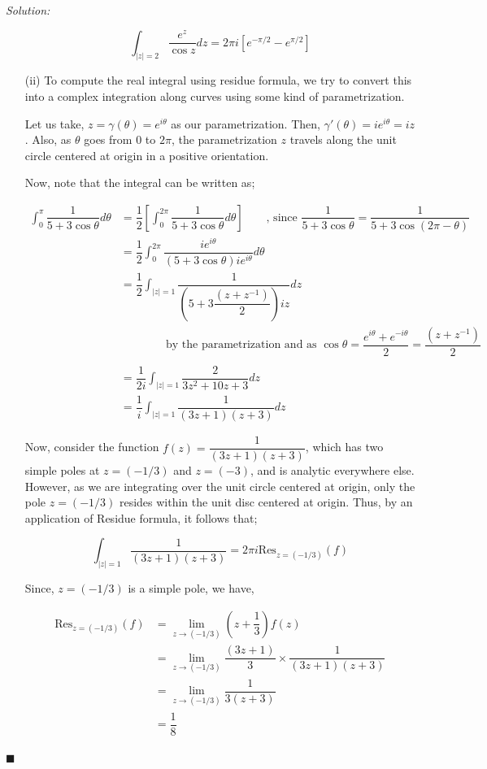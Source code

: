 \documentclass[12pt]{article}
\newcommand{\res}{\text{Res}}
\theoremstyle{definition}
\newenvironment{answer}{\textit{Solution: }\quad }{ \hfill $\blacksquare$}
\numberwithin{equation}{section}
\begin{document}
\begin{answer}
\begin{enumerate}
		$$
		\int_{\vert z \vert = 2} \dfrac{e^z}{\cos z} dz = 2\pi i \left[ e^{-\pi/2} - e^{\pi/ 2} \right]
		$$
		

		\item[(ii)] To compute the real integral using residue formula, we try to convert this into a complex integration along curves using some kind of parametrization. 
		
		Let us take, $z = \gamma(\theta) = e^{i\theta}$ as our parametrization. Then, $\gamma'(\theta) = i e^{i\theta} = iz$. Also, as $\theta$ goes from $0$ to $2\pi$, the parametrization $z$ travels along the unit circle centered at origin in a positive orientation.

		Now, note that the integral can be written as;

		\begin{align*}
			\int_{0}^{\pi} \dfrac{1}{5 + 3\cos \theta} d\theta
			& = \dfrac{1}{2} \left[ \int_{0}^{2\pi} \dfrac{1}{5 + 3 \cos \theta} d\theta\right] \qquad \text{, since } \dfrac{1}{5 + 3 \cos \theta} = \dfrac{1}{5 + 3 \cos (2\pi - \theta)}\\
			& = \dfrac{1}{2} \int_{0}^{2\pi} \dfrac{ie^{i\theta}}{(5 + 3 \cos \theta)ie^{i\theta}}d\theta\\
			& = \dfrac{1}{2} \int_{ \vert z \vert = 1} \dfrac{1}{\left(5 + 3 \dfrac{(z + z^{-1})}{2}\right) iz} dz\\
			& \qquad \qquad \text{by the parametrization and as } \cos \theta = \dfrac{e^{i\theta} + e^{-i\theta}}{2} = \dfrac{(z + z^{-1})}{2}\\
			& \\
			& = \dfrac{1}{2i} \int_{\vert z \vert = 1} \dfrac{2}{3z^2 + 10z + 3} dz\\
			& = \dfrac{1}{i} \int_{\vert z \vert = 1} \dfrac{1}{(3z + 1)(z + 3)}dz
		\end{align*}

		Now, consider the function $f(z) = \dfrac{1}{(3z + 1)(z+3)}$, which has two simple poles at $z = (-1/3)$ and $z = (-3)$, and is analytic everywhere else. However, as we are integrating over the unit circle centered at origin, only the pole $z = (-1/3)$ resides within the unit disc centered at origin. Thus, by an application of Residue formula, it follows that;

		$$
		\int_{\vert z \vert = 1} \dfrac{1}{(3z + 1)(z + 3)} = 2\pi i\res_{z = (-1/3)}(f)
		$$

		Since, $z = (-1/3)$ is a simple pole, we have,

		\begin{align*}
			\res_{z = (-1/3)}(f)
			& = \lim_{z \rightarrow (-1/3)} \left( z + \dfrac{1}{3} \right)f(z)\\
			& = \lim_{z \rightarrow (-1/3)} \dfrac{(3z + 1)}{3} \times \dfrac{1}{(3z + 1)(z+3)}\\
			& = \lim_{z \rightarrow (-1/3)} \dfrac{1}{3(z+3)}\\
			& = \dfrac{1}{8}
		\end{align*}


\end{enumerate}
\end{answer}
\end{document}
